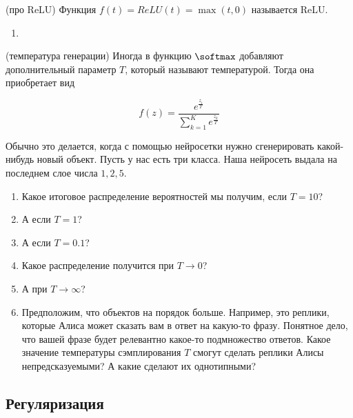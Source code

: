 \begin{problem}{(про ReLU)}
	Функция $f(t) = ReLU(t) = \max(t, 0)$ называется ReLU.
	\begin{enumerate}
        \item 
	\end{enumerate}
\end{problem} 







\begin{problem}{(температура генерации)}
	Иногда в функцию $\softmax$ добавляют дополнительный параметр $T$, который называют температурой. Тогда она приобретает вид 
	
	$$ 
	f(z) =  \frac{e^{\tfrac{z_i}{T}}}{ \sum_{k=1}^K e^{\tfrac{z_k}{T}}}
	$$

	Обычно это делается, когда с помощью нейросетки нужно сгенерировать какой-нибудь новый объект.  Пусть у нас есть три класса. Наша нейросеть выдала на последнем слое числа $1,2,5$. 

	\begin{enumerate}
		\item  Какое итоговое распределение вероятностей мы получим, если $T = 10$? 
		\item  А если $T = 1$? 
		\item  А если $T = 0.1$? 
		\item  Какое распределение получится при $T \to 0$? 
		\item  А при $T \to \infty$? 
		\item  Предположим, что объектов на порядок больше. Например, это реплики, которые Алиса может сказать вам в ответ на какую-то фразу.  Понятное дело, что вашей фразе будет релевантно какое-то подмножество ответов. Какое значение температуры сэмплирования $T$ смогут сделать реплики Алисы непредсказуемыми? А какие сделают их однотипными? 
	\end{enumerate}
\end{problem}


\subsection{Регуляризация}

